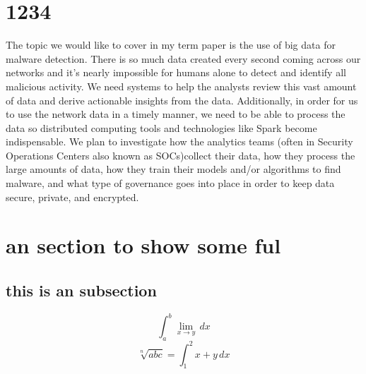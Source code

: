 \section{1234}
The topic we would like to cover in my term paper is the use of big data for malware detection. There is so much data created every second coming across our networks and it’s nearly impossible for humans alone to detect and identify all malicious activity. We need systems to help the analysts review this vast amount of data\cite{8406963} and derive actionable insights from the data. Additionally, in order for us to use the network data in a timely manner, we need to be able to process the data so distributed computing tools and technologies like Spark become indispensable. We plan to investigate how the analytics teams (often in Security Operations Centers also known as SOCs)\cite{zhou2021rethinking}collect their data, how they process the large amounts of data, how they train their models and/or algorithms to find malware, and what type of governance goes into place in order to keep data secure, private, and encrypted. \cite{8406963,no_5,poudyal2019malware,no_4,wassermann2018bigmomal}

\section{an section to show some ful}

\subsection{this is an subsection}

$$ \int_{a}^{b} \lim_{x \to y}   \,dx  $$
$$ \sqrt[n]{abc}=\int_{1}^{2}x+y  \,dx   $$